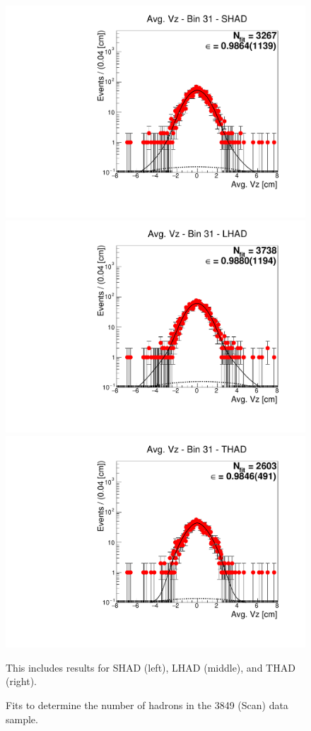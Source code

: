 \begin{figure}[H]
\centering
\includegraphics[scale=0.25]{figures/plots/nonDDbar_fit_results/scan/fit_scan_31_data_SHAD.pdf}
\hspace{-0.5cm}
\includegraphics[scale=0.25]{figures/plots/nonDDbar_fit_results/scan/fit_scan_31_data_LHAD.pdf}
\hspace{-0.5cm}
\includegraphics[scale=0.25]{figures/plots/nonDDbar_fit_results/scan/fit_scan_31_data_THAD.pdf}
\caption{Fits to determine the number of hadrons in the 3849 (Scan) data sample.}
{This includes results for SHAD (left), LHAD (middle), and THAD (right).}
\label{fig:hadron_fits_scan_31}
\end{figure}

